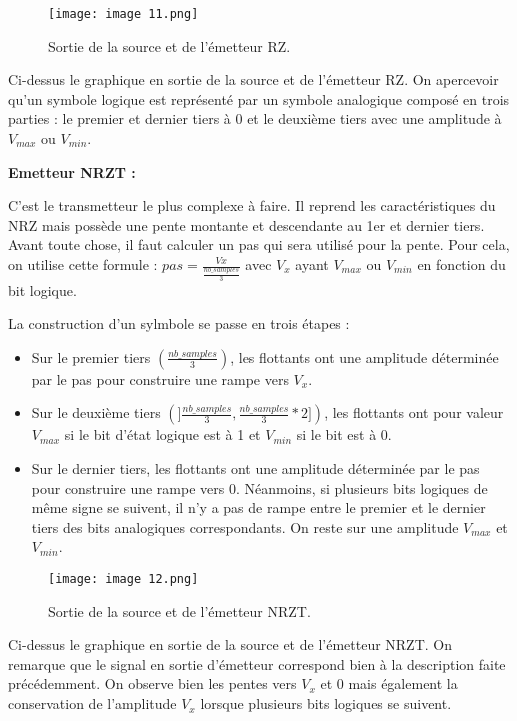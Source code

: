 \begin{figure}[H]
    \centering
    \texttt{[image: image 11.png]}
    \caption{\label{fig:image11}Sortie de la source et de l'émetteur RZ.}
\end{figure}

Ci-dessus le graphique en sortie de la source et de l'émetteur RZ. On apercevoir qu'un symbole logique est représenté par un symbole analogique composé en trois parties : le premier et dernier tiers à 0 et le deuxième tiers avec une amplitude à $V_{max}$ ou $V_{min}$.

\textbf{Emetteur NRZT :}

C'est le transmetteur le plus complexe à faire. Il reprend les caractéristiques du NRZ mais possède une pente montante et descendante au 1er et dernier tiers. Avant toute chose, il faut calculer un pas qui sera utilisé pour la pente. Pour cela, on utilise cette formule : $ pas = \frac{Vx}{\frac{nb\_samples}{3}} $ avec $V_x$ ayant $V_{max}$ ou $V_{min}$ en fonction du bit logique.

La construction d'un sylmbole se passe en trois étapes :
\begin{itemize}
    \item Sur le premier tiers $ \left(\frac{nb\_samples}{3} \right) $, les flottants ont une amplitude déterminée par le pas pour construire une rampe vers $V_x$.
    \item Sur le deuxième tiers $(]\frac{nb\_samples}{3}, \frac{nb\_samples}{3}*2]) $, les flottants ont pour valeur $V_{max}$ si le bit d'état logique est à 1 et $V_{min}$ si le bit est à 0.
    \item Sur le dernier tiers, les flottants ont une amplitude déterminée par le pas pour construire une rampe vers 0. Néanmoins, si plusieurs bits logiques de même signe se suivent, il n'y a pas de rampe entre le premier et le dernier tiers des bits analogiques correspondants. On reste sur une amplitude $V_{max}$ et $V_{min}$.
\end{itemize}

\begin{figure}[H]
    \centering
    \texttt{[image: image 12.png]}
    \caption{\label{fig:image12}Sortie de la source et de l'émetteur NRZT.}
\end{figure}

Ci-dessus le graphique en sortie de la source et de l'émetteur NRZT. On remarque que le signal en sortie d'émetteur correspond bien à la description faite précédemment. On observe bien les pentes vers $V_x$ et 0 mais également la conservation de l'amplitude $V_x$ lorsque plusieurs bits logiques se suivent.

